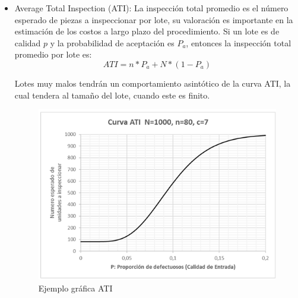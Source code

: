 \begin{itemize}
\item Average Total Inspection (ATI): La inspecci\'{o}n total promedio es el n\'{u}mero esperado de piezas a inspeccionar por lote, su valoraci\'{o}n es importante en la estimaci\'{o}n de los costos a largo plazo del procedimiento. Si un lote es de calidad $p$ y la probabilidad de aceptaci\'{o}n es $P_a$, entonces la inspecci\'{o}n total promedio por lote es:
$$ATI=n*P_a +N*(1-P_a)$$

Lotes muy malos tendr\'{a}n un comportamiento asint\'{o}tico de la curva ATI, la cual tendera al tama\~{n}o del lote, cuando este es finito.

\begin{figure}[h!]
  \centering
  \includegraphics[scale=0.6]{IMAGENES/Figura3.png}
  \caption{Ejemplo gr\'{a}fica ATI}
\end{figure}
\end{itemize}



